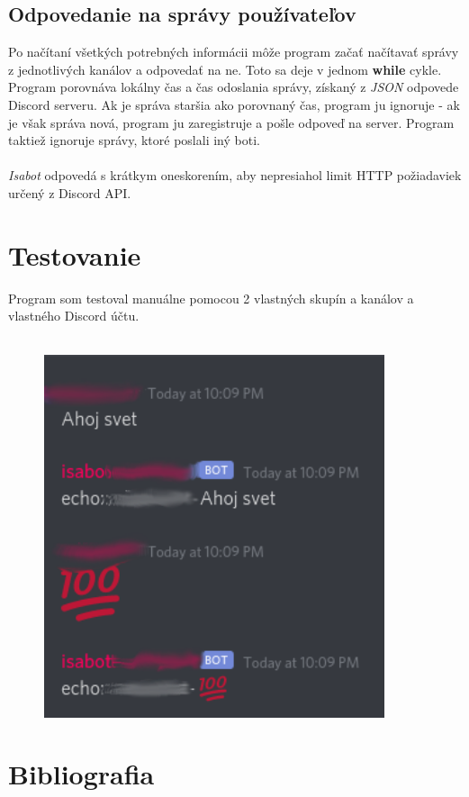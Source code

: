 \documentclass[a4paper,12pt]{article}
\begin{document}
\subsection{Odpovedanie na správy používateľov}
Po načítaní všetkých potrebných informácii môže program začať načítavať správy z jednotlivých kanálov a odpovedať na ne. Toto sa deje v jednom \textbf{while} cykle. Program porovnáva lokálny čas a čas odoslania správy, získaný z \textit{JSON} odpovede Discord serveru. Ak je správa staršia ako porovnaný čas, program ju ignoruje - ak je však správa nová, program ju zaregistruje a pošle odpoveď na server. Program taktiež ignoruje správy, ktoré poslali iný boti.
\\\\
\textit{Isabot} odpovedá s krátkym oneskorením, aby nepresiahol limit HTTP požiadaviek určený z Discord API.

\newpage
\section{Testovanie}
Program som testoval manuálne pomocou 2 vlastných skupín a kanálov a vlastného Discord účtu. 
\\\\
\begin{figure}[htp]
    \centering
    \includegraphics[width=10cm]{isabot.png}
    \label{fig:isabot}
\end{figure}

\newpage
\section{Bibliografia}


\nocite{discord}
\nocite{stackoverflow}
\nocite{wiki_ssl}
\nocite{wiki_https}
\end{document}
